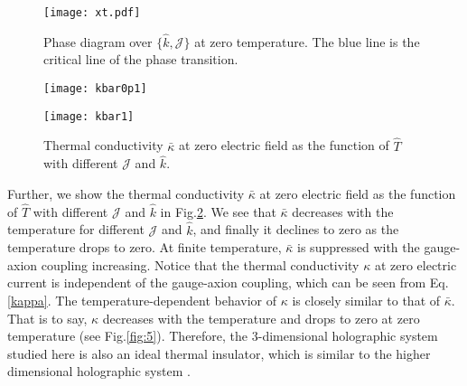 \documentclass[preprint,onecolumn,nofootinbib]{revtex4}
\begin{document}
\begin{figure}[H]
	\centering
	\texttt{[image: xt.pdf]}
	\caption{Phase diagram over $\{\hat{k},\mathcal{J}\}$ at zero temperature. The blue
		line is the critical line of the phase transition.}
	\label{fig:7}
\end{figure}
\begin{figure}[H]
	\begin{minipage}[t]{0.5\linewidth}
		\centering
		\texttt{[image: kbar0p1]}
	\end{minipage}
	\begin{minipage}[t]{0.5\linewidth}
		\centering
		\texttt{[image: kbar1]}
	\end{minipage}
	\caption{Thermal conductivity $\bar{\kappa}$ at zero electric field as the function of $\hat{T}$ with different  $\mathcal{J}$ and $\hat{k}$.}
	\label{fig:3}
\end{figure}
Further, we show the thermal conductivity $\bar{\kappa}$ at zero electric field as the function of $\hat{T}$ with different $\mathcal{J}$ and $\hat{k}$ in Fig.\ref{fig:3}. We see that $\bar{\kappa}$ decreases with the temperature for different $\mathcal{J}$ and $\hat{k}$, and finally it declines to zero as the temperature drops to zero. At finite temperature, $\bar{\kappa}$ is suppressed with the gauge-axion coupling increasing. Notice that the thermal conductivity $\kappa$ at zero electric current is independent of the gauge-axion coupling, which can be seen from Eq.\eqref{kappa}. The temperature-dependent behavior of $\kappa$ is closely similar to that of $\bar{\kappa}$. That is to say, $\kappa$ decreases with the temperature and drops to zero at zero temperature (see Fig.\ref{fig:5}). Therefore, the $3$-dimensional holographic system studied here is also an ideal thermal insulator, which is similar to the higher dimensional holographic system \cite{Gouteraux:2016wxj,Baggioli:2016pia,Li:2018vrz}.
\end{document}
